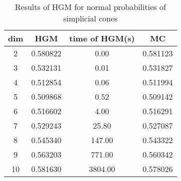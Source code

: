 \begin{table}[htbp]
\begin{center}
\begin{tabular}{cccc}
dim& HGM & time of HGM(s) & MC\\
\hline
2 & 0.580822 & 0.00 & 0.581123\\
3 & 0.532131 & 0.01 & 0.531827\\
4 & 0.512854 & 0.06 & 0.511994\\
5 & 0.509868 & 0.52 & 0.509142\\
6 & 0.516602 & 4.00 & 0.516291\\
7 & 0.529243 & 25.80 & 0.527087\\
8 & 0.545340 & 147.00 & 0.543322\\
9 & 0.563203 & 771.00 & 0.560342\\
10 & 0.581630 & 3804.00 & 0.578026\\
\hline
\end{tabular}
\end{center}
\caption{Results of HGM for normal probabilities of simplicial cones}
\label{tab2}
\end{table}
